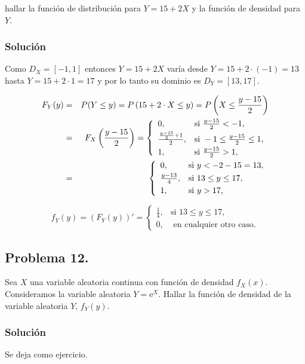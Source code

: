 \documentclass[
]{article}
\begin{document}
hallar la función de distribución para \(Y=15+2X\) y la función de
densidad para \(Y\).

\subsubsection{Solución}\label{soluciuxf3n-10}

Como \(D_X=[-1,1]\) entonces \(Y=15+2 X\) varía desde
\(Y=15+2\cdot (-1)=13\) hasta \(Y=15+2\cdot 1=17\) y por lo tanto su
dominio es \(D_Y=[13,17].\)

\begin{eqnarray*}
F_Y(y)&=& P(Y\leq y) =P\left(15+2\cdot X\leq y\right)=
P\left(X\leq \frac{y-15}{2}\right)
\\&=& 
F_X\left(\frac{y-15}{2}\right)=
\left\{\begin{array}{ll}
0, & \mbox{si } \frac{y-15}{2}<-1,
\\[0.1cm]
{\frac{y-15}{2}+1\over 2}, & \mbox{si } -1\leq \frac{y-15}{2} \leq
1,\\[0.1cm]
1, & \mbox{si } \frac{y-15}{2}>1,
\end{array}\right.
\\&=& 
\left\{\begin{array}{ll}
0, & \mbox{si } y<-2-15=13
,
\\[0.1cm]
\frac{y-13}{4}, & \mbox{si } 13\leq y \leq
17,
 \\[0.1cm]
1, & \mbox{si } y>17,
\end{array}\right.
\end{eqnarray*}

\[
f_Y(y)=(F_Y(y))'=
\left\{\begin{array}{ll}
\frac{1}{4}, & \mbox{si } 13\leq y \leq
17,
 \\[0.1cm]
0, & \mbox{ en cualquier otro caso}.
\end{array}\right.
\]

\subsection{Problema 12.}\label{problema-12.}

Sea \(X\) una variable aleatoria continua con función de densidad
\(f_X(x)\). Consideramos la variable aleatoria \(Y=\mathrm{e}^X\).
Hallar la función de densidad de la variable aleatoria \(Y\),
\(f_Y(y)\).

\subsubsection{Solución}\label{soluciuxf3n-11}

Se deja como ejercicio.
\end{document}
